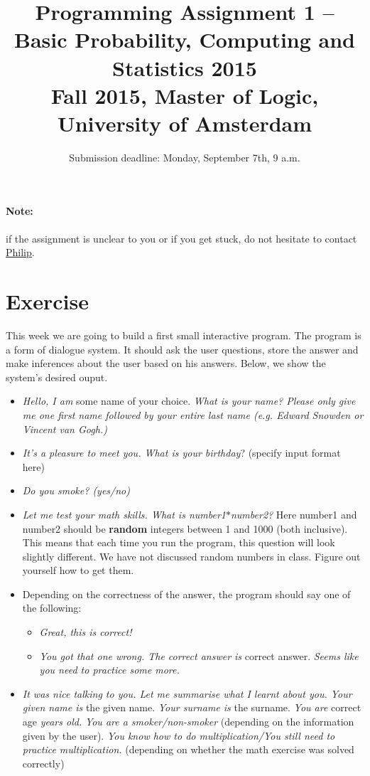 \documentclass[11pt, leqno, a4paper]{article}
\title{Programming Assignment 1 -- Basic Probability, Computing and Statistics 2015 \\[2mm]
\large{Fall 2015, Master of Logic, University of Amsterdam}}
\author{}
\date{Submission deadline: Monday, September 7th, 9 a.m.}
\begin{document}
\maketitle

\paragraph{Note:} if the assignment is unclear to you or if you get stuck, do not hesitate to contact \href{mailto:P.Schulz@uva.nl}{Philip}.

\section{Exercise}
This week we are going to build a first small interactive program. The program is a form of dialogue system. It should ask the user questions,
store the answer and make inferences about the user based on his answers. Below, we show the system's desired ouput. 
\begin{itemize}
\item \textit{Hello, I am} some name of your choice. \textit{What is
    your name? Please only give me one first name followed by your
    entire last name (e.g. \emph{Edward Snowden} or \emph{Vincent van Gogh}.)}
\item \textit{It's a pleasure to meet you. What is your birthday}? (specify input format here)
\item \textit{Do you smoke? (yes/no)}
\item \textit{Let me test your math skills. What is number1$ *
    $number2?} Here number1 and number2 should be \textbf{random} integers between 1 and 1000
(both inclusive). This means that each time you run the program, this question will look slightly different. We have not discussed random
numbers in class. Figure out yourself how to get them.
\item Depending on the correctness of the answer, the program should say one of the following:
\begin{itemize}
\item \textit{Great, this is correct!}
\item \textit{You got that one wrong. The correct answer is} correct answer. \textit{Seems like you need to practice some more.}
\end{itemize}
\item \textit{It was nice talking to you. Let me summarise what I learnt about you. Your given name is} the given name. \textit{Your surname is}
the surname. \textit{You are} correct age \textit{years old.} 
\textit{You are a smoker/non-smoker} (depending on the information given by the user). \textit{You know how to do multiplication/You still
need to practice multiplication.} (depending on whether the math exercise was solved correctly)
\end{itemize}
\end{document}
